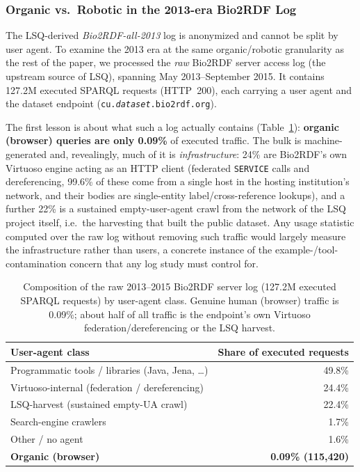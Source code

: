 \documentclass[sw]{iosart2x}
\begin{document}
\subsubsection{Organic vs.\ Robotic in the 2013-era Bio2RDF Log}\label{sec:bio2013}
The LSQ-derived \emph{Bio2RDF-all-2013} log is anonymized and cannot be split by user agent. To examine the 2013 era at the same organic/robotic granularity as the rest of the paper, we processed the \emph{raw} Bio2RDF server access log (the upstream source of LSQ), spanning May 2013--September 2015. It contains 127.2M executed SPARQL requests (HTTP~200), each carrying a user agent and the dataset endpoint (\texttt{cu.\textit{dataset}.bio2rdf.org}).

The first lesson is about what such a log actually contains (Table~\ref{tab:bio2013comp}): \textbf{organic (browser) queries are only 0.09\%} of executed traffic. The bulk is machine-generated and, revealingly, much of it is \emph{infrastructure}: 24\% are Bio2RDF's own Virtuoso engine acting as an HTTP client (federated \texttt{SERVICE} calls and dereferencing, 99.6\% of these come from a single host in the hosting institution's network, and their bodies are single-entity label/cross-reference lookups), and a further 22\% is a sustained empty-user-agent crawl from the network of the LSQ project itself, i.e.\ the harvesting that built the public dataset. Any usage statistic computed over the raw log without removing such traffic would largely measure the infrastructure rather than users, a concrete instance of the example-/tool-contamination concern that any log study must control for.

\begin{table}[ht]
\centering
\caption{Composition of the raw 2013--2015 Bio2RDF server log (127.2M executed SPARQL requests) by user-agent class. Genuine human (browser) traffic is 0.09\%; about half of all traffic is the endpoint's own Virtuoso federation/dereferencing or the LSQ harvest.}
\label{tab:bio2013comp}
\begin{tabular}{l|r}
\hline
User-agent class & Share of executed requests \\
\hline
Programmatic tools / libraries (Java, Jena, \ldots) & 49.8\% \\
Virtuoso-internal (federation / dereferencing) & 24.4\% \\
LSQ-harvest (sustained empty-UA crawl) & 22.4\% \\
Search-engine crawlers & 1.7\% \\
Other / no agent & 1.6\% \\
\textbf{Organic (browser)} & \textbf{0.09\% (115{,}420)} \\
\hline
\end{tabular}
\end{table}
\end{document}
